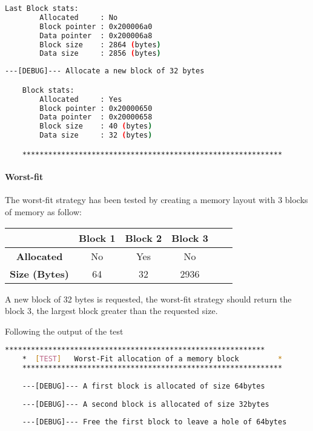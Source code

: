     \begin{outputbox}
    \begin{lstlisting}[language=bash]
    Last Block stats:
        Allocated     : No
        Block pointer : 0x200006a0
        Data pointer  : 0x200006a8
        Block size    : 2864 (bytes)
        Data size     : 2856 (bytes)
    \end{lstlisting}
    \end{outputbox}

    \begin{outputbox}
    \begin{lstlisting}[language=bash]
    ---[DEBUG]--- Allocate a new block of 32 bytes

    Block stats:
        Allocated     : Yes
        Block pointer : 0x20000650
        Data pointer  : 0x20000658
        Block size    : 40 (bytes)
        Data size     : 32 (bytes)

    ************************************************************
    \end{lstlisting}
    \end{outputbox}

    \paragraph{Worst-fit} The worst-fit strategy has been tested by creating a memory layout with 3 blocks of memory as follow:

    \begin{table}[h]
    \centering
    \begin{tabular}{|c|c|c|c|c|c|}
    \hline
    & \textbf{Block 1} & \textbf{Block 2} & \textbf{Block 3} \\
    \hline
    \textbf{Allocated} & No & Yes & No \\
    \textbf{Size (Bytes)} & 64 & 32 & 2936 \\
    \hline
    \end{tabular}
    \end{table}

    A new block of 32 bytes is requested, the worst-fit strategy should return the block 3, the largest block greater than the requested size.

    Following the output of the test

    \begin{outputbox}
    \begin{lstlisting}[language=bash]
    ************************************************************
    *  [TEST]   Worst-Fit allocation of a memory block         *
    ************************************************************
    
    ---[DEBUG]--- A first block is allocated of size 64bytes
    
    ---[DEBUG]--- A second block is allocated of size 32bytes
    
    ---[DEBUG]--- Free the first block to leave a hole of 64bytes
    \end{lstlisting}
    \end{outputbox}
    
